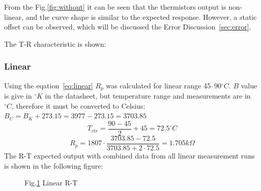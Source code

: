 \documentclass[a4,11pt]{article}
\makeatletter
\newcommand*{\rom}[1]{\expandafter\@slowromancap\romannumeral #1@}
\makeatother
\begin{document}
From the Fig.\ref{fig:without} it can be seen that the thermistors output is non-linear, and the curve shape is similar to the expected response. However, a static offset can be observed, which will be discussed the Error Discussion~\ref{sec:error}.

The T-R characteristic is shown:
\subsubsection{Linear}
Using the eqation~\ref{eq:linear} $R_{p}$ was calculated for linear range 45--90$^{\circ}C$. $B$ value is give in $^{\circ}K$ in the datasheet, but temperature range and measurements are in $^{\circ}C$, therefore it must be converted to Celsius:
$B_C=B_K+273.15=3977-273.15=3703.85$
$$T_{ctr}=\frac{90-45}{2}+45=72.5^{\circ}C$$
$$R_p=1807\cdot\frac{3703.85-72.5}{3703.85+2\cdot72.5}=1.705k\Omega$$
The R-T expected output with combined data from all linear measurement runs is shown in the following figure:
\begin{figure}[H]
  \centering
  \label{fig:with}
  Fig.\ref{fig:with} Linear R-T 
\end{figure}
\end{document}
